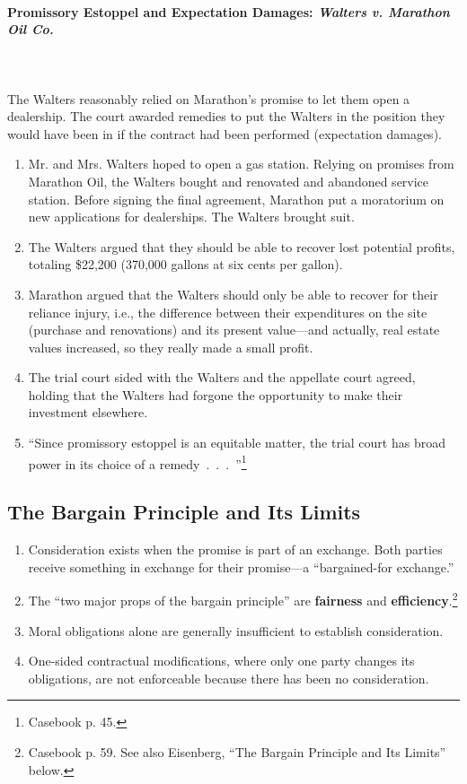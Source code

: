 \paragraph{Promissory Estoppel and Expectation Damages: \emph{Walters v. 
Marathon Oil Co.}}
~\\\\
The Walters reasonably relied on Marathon's promise to let them open a 
dealership. The court awarded remedies to put the Walters in the position they 
would have been in if the contract had been performed (expectation damages).

\begin{enumerate}
    \item Mr. and Mrs. Walters hoped to open a gas station. Relying on 
    promises from Marathon Oil, the Walters bought and renovated and abandoned 
    service station. Before signing the final agreement, Marathon put a 
    moratorium on new applications for dealerships. The Walters brought suit.
    \item The Walters argued that they should be able to recover lost 
    potential profits, totaling \$22,200 (370,000 gallons at six cents per 
    gallon).
    \item Marathon argued that the Walters should only be able to recover for 
    their reliance injury, i.e., the difference between their expenditures on 
    the site (purchase and renovations) and its present value---and actually, 
    real estate values increased, so they really made a small profit.
    \item The trial court sided with the Walters and the appellate court 
    agreed, holding that the Walters had forgone the opportunity to make their 
    investment elsewhere.
    \item ``Since promissory estoppel is an equitable matter, the trial court 
    has broad power in its choice of a remedy~.~.~.~''\footnote{Casebook p. 
    45.}
\end{enumerate}

\subsection{The Bargain Principle and Its Limits} 

\begin{enumerate}
    \item Consideration exists when the promise is part of an exchange. Both 
    parties receive something in exchange for their promise---a 
    ``bargained-for exchange.''
    \item The ``two major props of the bargain principle'' are 
    \textbf{fairness} and \textbf{efficiency}.\footnote{Casebook p. 59. See 
    also Eisenberg, ``The Bargain Principle and Its Limits'' below.}
    \item Moral obligations alone are generally insufficient to establish 
    consideration.
    \item One-sided contractual modifications, where only one party changes 
    its obligations, are not enforceable because there has been no 
    consideration.
\end{enumerate}

